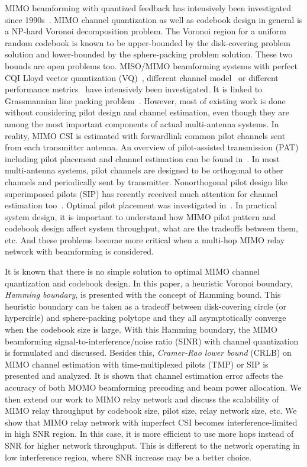 \documentclass[10pt,fleqn, twocolumn]{IEEEtran}
\begin{document}
MIMO beamforming with quantized feedback has intensively been
investigated since 1990s~\cite{Gerlach94}. MIMO channel
quantization as well as codebook design in general is a NP-hard
Voronoi decomposition problem. The Voronoi region for a uniform
random codebook is known to be upper-bounded by the disk-covering
problem solution and lower-bounded by the sphere-packing problem
solution. These two bounds are open problems too. MISO/MIMO
beamforming systems with perfect CQI Lloyd vector quantization
(VQ)~\cite{Narula98}, different channel model~\cite{Mukka03} or
different performance metrics~\cite{PXia04,Roh04} have intensively
been investigated. It is linked to Grassmannian line packing
problem~\cite{Love02}. However, most of existing work is done
without considering pilot design and channel estimation, even
though they are among the most important components of actual
multi-antenna systems. In reality, MIMO CSI is estimated with
forwardlink common pilot channels sent from each transmitter
antenna. An overview of pilot-assisted transmission (PAT)
including pilot placement and channel estimation can be found
in~\cite{Tong04}. In most multi-antenna systems, pilot channels
are designed to be orthogonal to other channels and periodically
sent by transmitter. Nonorthogonal pilot design like superimposed
pilots (SIP) has recently received much attention for channel
estimation too~\cite{Coldrey06}. Optimal pilot placement was
investigated in~\cite{Dong02}. In practical system design, it is
important to understand how MIMO pilot pattern and codebook design
affect system throughput, what are the tradeoffs between them,
etc. And these problems become more critical when a multi-hop MIMO
relay network with beamforming is considered.

It is known that there is no simple solution to optimal MIMO
channel quantization and codebook design. In this paper, a
heuristic Voronoi boundary, {\em Hamming boundary}, is presented
with the concept of Hamming bound. This heuristic boundary can be
taken as a tradeoff between disk-covering circle (or hypercirle)
and sphere-packing polytope and they all asymptotically converge
when the codebook size is large. With this Hamming boundary, the
MIMO beamforming signal-to-interference/noise ratio (SINR) with
channel quantization is formulated and discussed. Besides this,
{\em Cramer-Rao lower bound} (CRLB) on MIMO channel estimation
with time-multiplexed pilots (TMP) or SIP is presented and
analyzed. It is shown that channel estimation error affects the
accuracy of both MOMO beamforming precoding and beam power
allocation. We then extend our work to MIMO relay network and
discuss the scalability of MIMO relay throughput by codebook size,
pilot size, relay network size, etc. We show that MIMO relay
network with imperfect CSI becomes interference-limited in high
SNR region. In this case, it is more efficient to use more hops
instead of SNR for higher network throughput. This is different to
the network operating in low interference region, where SNR
increase may be a better choice.
\end{document}
